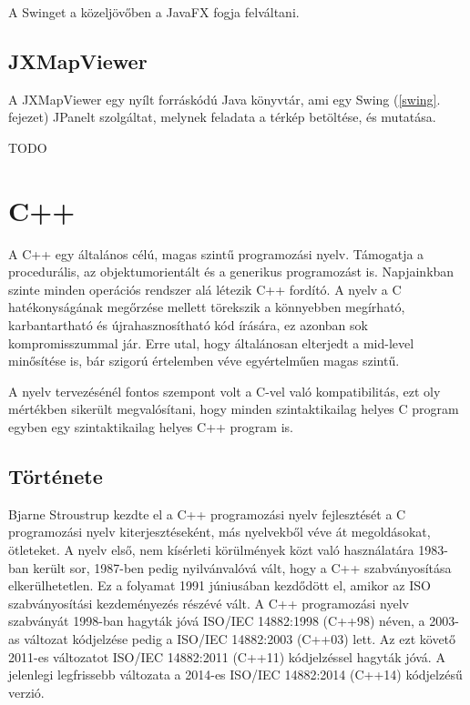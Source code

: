 \documentclass[a4paper,12pt]{report}
\begin{document}
\vspace{2mm}
A Swinget a közeljövőben a JavaFX \cite{javafx} fogja felváltani.

\subsection{JXMapViewer}
\label{jxmapviewer}

A JXMapViewer \cite{jxmapv} egy nyílt forráskódú Java könyvtár, ami egy Swing (\ref{swing}. fejezet) JPanelt \cite{jpanel} szolgáltat, melynek feladata a térkép betöltése, és mutatása.

\vspace{2mm}
TODO

\newpage
\section{C++}
\label{cplusplus}

A C++ egy általános célú, magas szintű programozási nyelv. Támogatja a procedurális, az objektumorientált és a generikus programozást is. Napjainkban szinte minden operációs rendszer alá létezik C++ fordító. A nyelv a C hatékonyságának megőrzése mellett törekszik a könnyebben megírható, karbantartható és újrahasznosítható kód írására, ez azonban sok kompromisszummal jár. Erre utal, hogy általánosan elterjedt a mid-level minősítése is, bár szigorú értelemben véve egyértelműen magas szintű.

\vspace{2mm}
A nyelv tervezésénél fontos szempont volt a C-vel való kompatibilitás, ezt oly mértékben sikerült megvalósítani, hogy minden szintaktikailag helyes C program egyben egy szintaktikailag helyes C++ program is. 



\subsection{Története}
\label{cpphistory}

Bjarne Stroustrup kezdte el a C++ programozási nyelv fejlesztését a C programozási nyelv kiterjesztéseként, más nyelvekből véve át megoldásokat, ötleteket. A nyelv első, nem kísérleti körülmények közt való használatára 1983-ban került sor, 1987-ben pedig nyilvánvalóvá vált, hogy a C++ szabványosítása elkerülhetetlen. Ez a folyamat 1991 júniusában kezdődött el, amikor az ISO szabványosítási kezdeményezés részévé vált. A C++ programozási nyelv szabványát 1998-ban hagyták jóvá ISO/IEC 14882:1998 \cite{c++98} (C++98) néven, a 2003-as változat kódjelzése pedig a ISO/IEC 14882:2003 \cite{c++03} (C++03) lett. Az ezt követő 2011-es változatot ISO/IEC 14882:2011 \cite{c++11} (C++11) kódjelzéssel hagyták jóvá. A jelenlegi legfrissebb változata a 2014-es ISO/IEC 14882:2014 \cite{c++14} (C++14) kódjelzésű verzió. 
\end{document}
